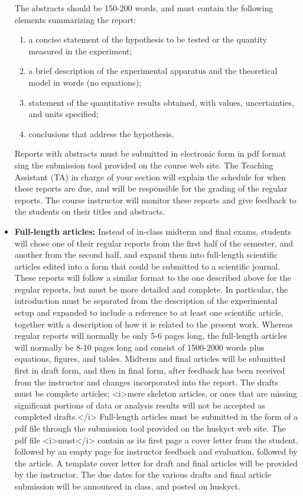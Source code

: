 \documentclass{revtex4}
\begin{document}
\begin{itemize}
The abstracts should be 150-200 words, and must contain the following elements
summarizing the report:
\begin{enumerate}
\item
a concise statement of the hypothesis to be tested or the quantity measured
in the experiment;
\item
a brief description of the experimental apparatus and the theoretical model in 
words (no equations);
\item
statement of the quantitative results obtained, with values, uncertainties,
and units specified;
\item
conclusions that address the hypothesis.
\end{enumerate}
Reports with abstracts must be submitted in electronic form in pdf format 
sing the submission tool provided on the course web site. The Teaching Assistant
(TA) in charge of your section will explain the schedule for when these reports
are due, and will be responsible for the grading of the regular reports.  The
course instructor will monitor these reports and give feedback to the students
on their titles and abstracts.

\item
{\bf Full-length articles:} Instead of in-class midterm and final
exams, students will chose one of their regular reports from the first
half of the semester, and another from the second half, and expand them
into full-length scientific articles edited into a form that could be
submitted to a scientific journal.  These reports will follow a similar
format to the one described above for the regular reports, but must be
more detailed and complete.  In particular, the introduction must be
separated from the description of the experimental setup and expanded
to include a reference to at least one scientific article, together
with a description of how it is related to the present work.  Whereas
regular reports will normally be only 5-6 pages long, the full-length
articles will normally be 8-10 pages long and consist of 1500-2000
words plus equations, figures, and tables.
Midterm and final articles will be submitted first in draft form,
and then in final form, after feedback has been received from the 
instructor and changes incorporated into the report.  The drafts
must be complete articles; <i>mere skeleton articles, or ones
that are missing significant portions of data or analysis results
will not be accepted as completed drafts.</i> Full-length articles
must be submitted in the form of a pdf file through the submission
tool provided on the huskyct web site.  The pdf file <i>must</i>
contain as its first page a cover letter from the student, followed
by an empty page for instructor feedback and evaluation, followed
by the article.  A template cover letter for draft and final articles
will be provided by the instructor.  The due dates for the
various drafts and final article submission will be announced in
class, and posted on huskyct.


\end{itemize}
\end{document}
